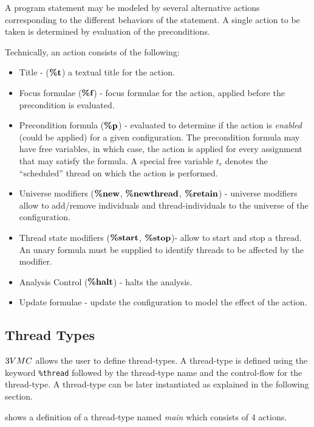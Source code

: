 A program statement may be modeled by several alternative actions
corresponding to the different behaviors of the statement. A
single action to be taken is determined by evaluation of the
preconditions.

Technically, an action consists of the following:
\begin{itemize}
\item Title - ($\textbf{\%t}$) a textual title for the action.
\item Focus formulae ($\textbf{\%f}$) - focus formulae for the action, applied
before the precondition is evaluated.
\item Precondition formula ($\textbf{\%p}$) - evaluated to determine if the action
is \emph{enabled} (could be applied) for a given configuration.
The precondition formula may have free variables, in which case,
the action is applied for every assignment that may satisfy the
formula. A special free variable $t_r$ denotes the ``scheduled''
thread on which the action is performed.
\item Universe modifiers ($\textbf{\%new}$, $\textbf{\%newthread}$, $\textbf{\%retain}$) - universe modifiers allow to add/remove
individuals and thread-individuals to the universe of the
configuration.
\item Thread state modifiers ($\textbf{\%start}$, $\textbf{\%stop}$)- allow to start and stop a thread.
An unary formula must be supplied to identify threads to be
affected by the modifier.
\item Analysis Control ($\textbf{\%halt}$) - halts the analysis.
\item Update formulae - update the configuration to model the
effect of the action.
\end{itemize}



\subsection{Thread Types}

$\tvmc$ allows the user to define thread-types. A thread-type is
defined using the keyword \texttt{\%thread} followed by the
thread-type name and the control-flow for the thread-type. A
thread-type can be later instantiated as explained in the
following section.

 shows a definition of a thread-type named
\emph{main} which consists of 4 actions.

